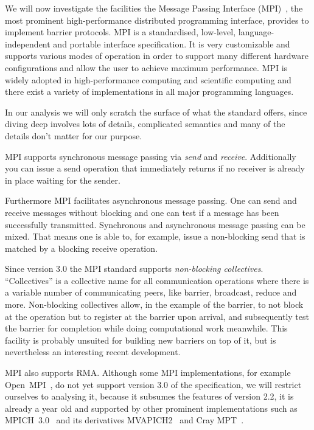 \documentclass[a4paper, 10pt]{article}
\begin{document}
We will now investigate the facilities the Message Passing Interface (MPI)~\cite{mpi3}, the most prominent high-performance distributed programming interface, provides to implement barrier protocols. MPI is a standardised, low-level, language-independent and portable interface specification. It is very customizable and supports various modes of operation in order to support many different hardware configurations and allow the user to achieve maximum performance. MPI is widely adopted in high-performance computing and scientific computing\cite{mpiadoptiona, mpiadoptionb, mpiadoptionc} and there exist a variety of implementations in all major programming languages.

In our analysis we will only scratch the surface of what the standard offers, since diving deep involves lots of details, complicated semantics and many of the details don't matter for our purpose.

MPI supports synchronous message passing via \emph{send} and \emph{receive}. Additionally you can issue a send operation that immediately returns if no receiver is already in place waiting for the sender.

Furthermore MPI facilitates asynchronous message passing. One can send and receive messages without blocking and one can test if a message has been successfully transmitted. Synchronous and asynchronous message passing can be mixed. That means one is able to, for example, issue a non-blocking send that is matched by a blocking receive operation.

Since version 3.0 the MPI standard supports \emph{non-blocking collectives}. ``Collectives'' is a collective name for all communication operations where there is a variable number of communicating  peers, like barrier, broadcast, reduce and more.
Non-blocking collectives allow, in the example of the barrier, to not block at the operation but to register at the barrier upon arrival, and subsequently test the barrier for completion while doing computational work meanwhile.
This facility is probably unsuited for building new barriers on top of it, but is nevertheless an interesting recent development.

MPI also supports RMA. Although some MPI implementations, for example Open~MPI~\cite{openmpi}, do not yet support version 3.0 of the specification, we will restrict ourselves to analysing it, because it subsumes the features of version 2.2, it is already a year old and supported by other prominent implementations such as MPICH~3.0~\cite{mpich} and its derivatives MVAPICH2~\cite{mvapich} and Cray MPT~\cite{craympt}.
\end{document}
